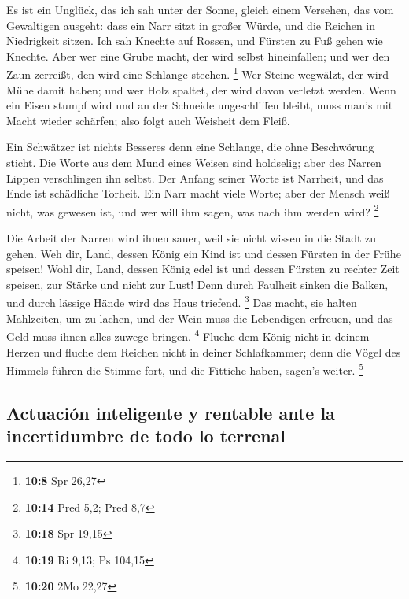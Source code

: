  Es ist ein Unglück, das ich sah unter der Sonne, gleich
einem Versehen, das vom Gewaltigen ausgeht:  dass ein Narr
sitzt in großer Würde, und die Reichen in Niedrigkeit sitzen.
 Ich sah Knechte auf Rossen, und Fürsten zu Fuß gehen wie
Knechte.  Aber wer eine Grube macht, der wird selbst
hineinfallen; und wer den Zaun zerreißt, den wird eine Schlange stechen.
\footnote{\textbf{10:8} Spr 26,27}  Wer Steine wegwälzt,
der wird Mühe damit haben; und wer Holz spaltet, der wird davon verletzt
werden.  Wenn ein Eisen stumpf wird und an der Schneide
ungeschliffen bleibt, muss man's mit Macht wieder schärfen; also folgt
auch Weisheit dem Fleiß.

 Ein Schwätzer ist nichts Besseres denn eine Schlange,
die ohne Beschwörung sticht.  Die Worte aus dem Mund
eines Weisen sind holdselig; aber des Narren Lippen verschlingen ihn
selbst.  Der Anfang seiner Worte ist Narrheit, und das
Ende ist schädliche Torheit.  Ein Narr macht viele Worte;
aber der Mensch weiß nicht, was gewesen ist, und wer will ihm sagen, was
nach ihm werden wird? \footnote{\textbf{10:14} Pred 5,2; Pred 8,7}

 Die Arbeit der Narren wird ihnen sauer, weil sie nicht
wissen in die Stadt zu gehen.  Weh dir, Land, dessen
König ein Kind ist und dessen Fürsten in der Frühe speisen!
 Wohl dir, Land, dessen König edel ist und dessen Fürsten
zu rechter Zeit speisen, zur Stärke und nicht zur Lust! 
Denn durch Faulheit sinken die Balken, und durch lässige Hände wird das
Haus triefend. \footnote{\textbf{10:18} Spr 19,15}  Das
macht, sie halten Mahlzeiten, um zu lachen, und der Wein muss die
Lebendigen erfreuen, und das Geld muss ihnen alles zuwege bringen.
\footnote{\textbf{10:19} Ri 9,13; Ps 104,15}  Fluche dem
König nicht in deinem Herzen und fluche dem Reichen nicht in deiner
Schlafkammer; denn die Vögel des Himmels führen die Stimme fort, und die
Fittiche haben, sagen's weiter. \footnote{\textbf{10:20} 2Mo 22,27}

\hypertarget{actuaciuxf3n-inteligente-y-rentable-ante-la-incertidumbre-de-todo-lo-terrenal}{%
\subsection{Actuación inteligente y rentable ante la incertidumbre de
todo lo
terrenal}\label{actuaciuxf3n-inteligente-y-rentable-ante-la-incertidumbre-de-todo-lo-terrenal}}

